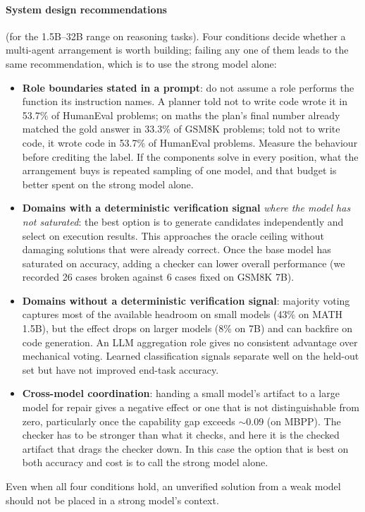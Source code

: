 \documentclass[11pt,a4paper]{article}
\begin{document}
\paragraph{System design recommendations} (for the 1.5B--32B range on reasoning tasks). Four conditions
decide whether a multi-agent arrangement is worth building; failing any one of them leads to the same
recommendation, which is to use the strong model alone:
\begin{itemize}\itemsep2pt
\item \textbf{Role boundaries stated in a prompt}: do not assume a role performs the function its
      instruction names. A planner told not to write code wrote it in 53.7\% of HumanEval problems; on maths the plan's final number already matched the gold answer in 33.3\% of GSM8K
      problems; told not to write code, it wrote code in 53.7\% of HumanEval problems. Measure the
      behaviour before crediting the label. If the components solve in every position, what the
      arrangement buys is repeated sampling of one model, and that budget is better spent on the strong
      model alone.
\item \textbf{Domains with a deterministic verification signal} \emph{where the model has not saturated}:
      the best option is to generate candidates independently and select on execution results. This
      approaches the oracle ceiling without damaging solutions that were already correct. Once the base
      model has saturated on accuracy, adding a checker can lower overall performance (we recorded 26
      cases broken against 6 cases fixed on GSM8K 7B).
\item \textbf{Domains without a deterministic verification signal}: majority voting captures most of the
      available headroom on small models (43\% on MATH 1.5B), but the effect drops on larger models (8\%
      on 7B) and can backfire on code generation. An LLM aggregation role gives no consistent advantage
      over mechanical voting. Learned classification signals separate well on the held-out set but have
      not improved end-task accuracy.
\item \textbf{Cross-model coordination}: handing a small model's artifact to a large model for repair
      gives a negative effect or one that is not distinguishable from zero, particularly once the
      capability gap exceeds $\sim$0.09 (on MBPP). The checker has to be stronger than what it checks,
      and here it is the checked artifact that drags the checker down. In this case the option that is
      best on both accuracy and cost is to call the strong model alone.
\end{itemize}
Even when all four conditions hold, an unverified solution from a weak model should not be placed in a
strong model's context.
\end{document}
